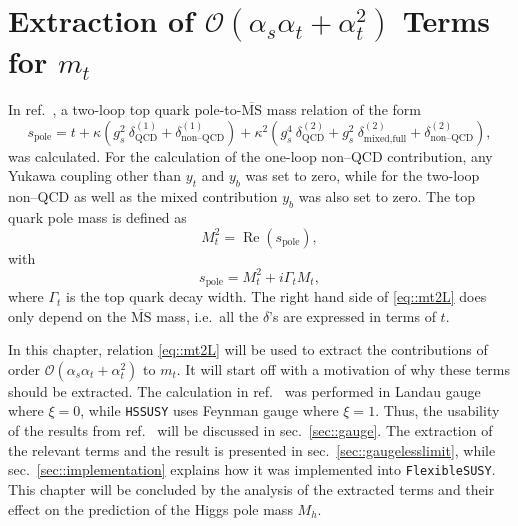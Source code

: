 \documentclass[a4paper,12pt]{book}
\begin{document}
\chapter{ Extraction of $\mathcal{O}(\alpha_s \alpha_t+\alpha_t^2)$ Terms for $m_t$}
\label{chapter::extraction}
In ref.\ \cite{martinmain}, a two-loop top quark pole-to-$\overline{\text{MS}}$ mass relation of the form
\begin{equation}
\label{eq::mt2L}
s_\text{pole} = t + \kappa \left(g_s^2 \> \delta^{(1)}_\text{QCD} + \delta^{(1)}_\text{non--QCD}\right)+\kappa^2 \left(g_s^4 \> \delta^{(2)}_\text{QCD}+ g_s^2 \> \delta^{(2)}_\text{mixed,full} + \delta^{(2)}_\text{non--QCD}\right) ,
\end{equation}
was calculated. For the calculation of the one-loop non--QCD contribution, any Yukawa coupling other than $y_t$ and $y_b$ was set to zero, while for the two-loop non--QCD as well as the mixed contribution $y_b$ was also set to zero. The top quark pole mass is defined as 
\begin{equation}
M^2_t = \operatorname{Re}(s_\text{pole}),
\end{equation} 
with 
\begin{equation}
s_\text{pole} = M_t^2 + i\Gamma_t M_t,
\end{equation}
where $\Gamma_t$ is the top quark decay width. The right hand side of \eqref{eq::mt2L} does only depend on the $\overline{\text{MS}}$ mass, i.e.\ all the $\delta$'s are expressed in terms of $t$.\par
In this chapter, relation \eqref{eq::mt2L} will be used to extract the contributions of order $\mathcal{O}(\alpha_s\alpha_t + \alpha_t^2)$ to $m_t$. It will start off with a motivation of why these terms should be extracted. The calculation in ref.\ \cite{martinmain} was performed in Landau gauge where $\xi = 0$, while \texttt{HSSUSY} uses Feynman gauge where $\xi=1$. Thus, the usability of the results from ref.\ \cite{martinmain} will be discussed in sec.\ \ref{sec::gauge}. The extraction of the relevant terms and the result is presented in sec.\ \ref{sec::gaugelesslimit}, while sec.\ \ref{sec::implementation} explains how it was implemented into \texttt{FlexibleSUSY}. This chapter will be concluded by the analysis of the extracted terms and their effect on the prediction of the Higgs pole mass $M_h$.  
\end{document}
